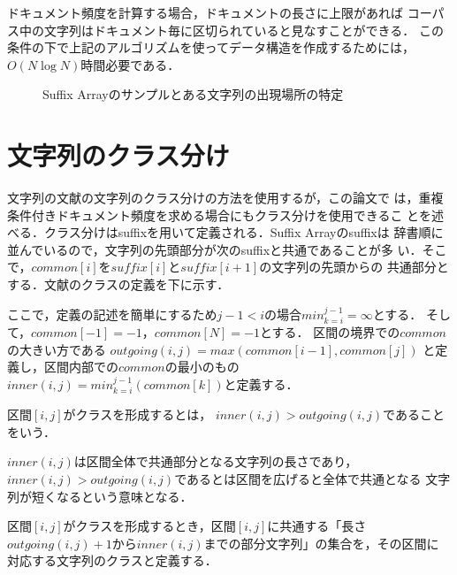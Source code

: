 ドキュメント頻度を計算する場合，ドキュメントの長さに上限があれば
コーパス中の文字列はドキュメント毎に区切られていると見なすことができる．
この条件の下で上記のアルゴリズムを使ってデータ構造を作成するためには，
$O(N \log N)$時間必要である．\par


 \begin{figure}[htbp]
  \begin{center}
   \epsfxsize=9cm
   
   \caption{Suffix Arrayのサンプルとある文字列の出現場所の特定}
   \label{suffix_array}
  \end{center}
 \end{figure}


\section{文字列のクラス分け}

文字列の文献\cite{DF1}の文字列のクラス分けの方法を使用するが，この論文で
は，重複条件付きドキュメント頻度を求める場合にもクラス分けを使用できるこ
とを述べる．クラス分けはsuffixを用いて定義される．Suffix Arrayのsuffixは
辞書順に並んでいるので，文字列の先頭部分が次のsuffixと共通であることが多
い．そこで，$common[i]$を$suffix[i]$と$suffix[i+1]$の文字列の先頭からの
共通部分とする．文献\cite{DF1}のクラスの定義を下に示す．\par

ここで，定義の記述を簡単にするため$j-1<i$の場合$min_{k=i}^{j-1}=∞$とする．
そして，$common[-1] = -1$，$common[N] = -1$とする．
区間の境界での$common$の大きい方である
$outgoing(i,j) = max(common[i-1],common[j])$
と定義し，区間内部での$common$の最小のもの
$inner(i,j)=min_{k=i}^{j-1}(common[k])$と定義する．\\
\par

\newpage
[定義]\par
区間$[i,j]$がクラスを形成するとは，
$inner(i,j) > outgoing(i,j)$であることをいう．\\
\par

$inner(i,j)$は区間全体で共通部分となる文字列の長さであり，
$inner(i,j)>outgoing(i,j)$であるとは区間を広げると全体で共通となる
文字列が短くなるという意味となる．

区間$[i,j]$がクラスを形成するとき，区間$[i,j]$に共通する「長さ
$outgoing(i,j)+1$から$inner(i,j)$までの部分文字列」の集合を，その区間に
対応する文字列のクラスと定義する．

